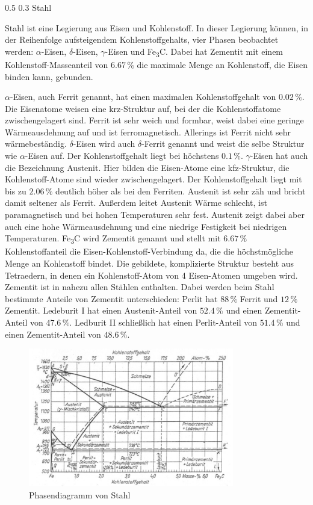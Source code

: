 \documentclass[german, %
parskip=full, %
bibliography=totoc, %
]{scrartcl}
\makeatletter
\renewcommand\subsection{\@startsection 
   {subsection}{2}{0mm}%
   {0.5\baselineskip}%
   {0.3\baselineskip}%
   {\bfseries\sffamily\large}%
   }
\makeatother
\begin{document}
\subsection{Stahl}

Stahl ist eine Legierung aus Eisen und Kohlenstoff. In dieser Legierung können, in der Reihenfolge aufsteigendem Kohlenstoffgehalts, vier Phasen beobachtet werden: $\alpha$-Eisen, $\delta$-Eisen, $\gamma$-Eisen und Fe\textsubscript{3}C. Dabei hat Zementit mit einem Kohlenstoff-Masseanteil von $6.67\,\%$ die maximale Menge an Kohlenstoff, die Eisen binden kann, gebunden. 

$\alpha$-Eisen, auch Ferrit genannt, hat einen maximalen Kohlenstoffgehalt von $0.02\,\%$. Die Eisenatome weisen eine krz-Struktur auf, bei der die Kohlenstoffatome zwischengelagert sind. Ferrit ist sehr weich und formbar, weist dabei eine geringe Wärmeausdehnung auf und ist ferromagnetisch. Allerings ist Ferrit nicht sehr wärmebeständig. \cite{ferrit}
$\delta$-Eisen wird auch $\delta$-Ferrit genannt und weist die selbe Struktur wie $\alpha$-Eisen auf. Der Kohlenstoffgehalt liegt bei höchstens $0.1\,\%$. 
$\gamma$-Eisen hat auch die Bezeichnung Austenit. Hier bilden die Eisen-Atome eine kfz-Struktur, die Kohlenstoff-Atome sind wieder zwischengelagert. Der Kohlenstoffgehalt liegt mit bis zu $2.06\,\%$ deutlich höher als bei den Ferriten. Austenit ist sehr zäh und bricht damit seltener als Ferrit. Außerdem leitet Austenit Wärme schlecht, ist paramagnetisch und bei hohen Temperaturen sehr fest. Austenit zeigt dabei aber auch eine hohe Wärmeausdehnung und eine niedrige Festigkeit bei niedrigen Temperaturen. \cite{austenit}
Fe\textsubscript{3}C wird Zementit genannt und stellt mit $6.67\,\%$ Kohlenstoffanteil die Eisen-Kohlenstoff-Verbindung da, die die höchstmögliche Menge an Kohlenstoff bindet. Die gebildete, komplizierte Struktur besteht aus Tetraedern, in denen ein Kohlenstoff-Atom von 4 Eisen-Atomen umgeben wird. Zementit ist in nahezu allen Stählen enthalten. Dabei werden beim Stahl bestimmte Anteile von Zementit unterschieden: Perlit hat $88\,\%$ Ferrit und $12\,\%$ Zementit. Ledeburit I hat einen Austenit-Anteil von $52.4\,\%$ und einen Zementit-Anteil von $47.6\,\%$. Ledburit II schließlich hat einen Perlit-Anteil von $51.4\,\%$ und einen Zementit-Anteil von $48.6\,\%$.


\begin{figure}[hb] 
  \centering
     \includegraphics[width=0.8\textwidth]{Stahl_Phase}
  \caption{Phasendiagramm von Stahl}
  \label{fig:phasestahl}
\end{figure}
\end{document}
